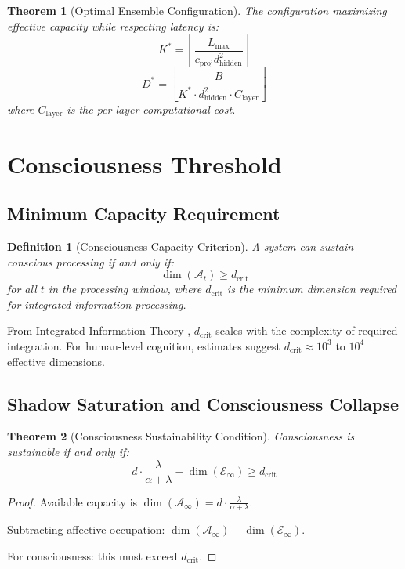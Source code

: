 \documentclass[reprint, amsmath, amssymb, aps, prd]{revtex4-2}
\newtheorem{definition}{Definition}[section]
\newtheorem{theorem}{Theorem}[section]
\begin{document}
\begin{theorem}[Optimal Ensemble Configuration]
The configuration maximizing effective capacity while respecting latency is:
\[
K^* = \left\lfloor \frac{L_{\text{max}}}{c_{\text{proj}} d_{\text{hidden}}^2} \right\rfloor
\]
\[
D^* = \left\lfloor \frac{B}{K^* \cdot d_{\text{hidden}}^2 \cdot C_{\text{layer}}} \right\rfloor
\]
where $C_{\text{layer}}$ is the per-layer computational cost.
\end{theorem}

\section{Consciousness Threshold}

\subsection{Minimum Capacity Requirement}

\begin{definition}[Consciousness Capacity Criterion]
A system can sustain conscious processing if and only if:
\[
\dim(\mathcal{A}_t) \geq d_{\text{crit}}
\]
for all $t$ in the processing window, where $d_{\text{crit}}$ is the minimum dimension required for integrated information processing.
\end{definition}

From Integrated Information Theory \cite{Tononi2016}, $d_{\text{crit}}$ scales with the complexity of required integration. For human-level cognition, estimates suggest $d_{\text{crit}} \approx 10^3$ to $10^4$ effective dimensions.

\subsection{Shadow Saturation and Consciousness Collapse}

\begin{theorem}[Consciousness Sustainability Condition]
Consciousness is sustainable if and only if:
\[
d \cdot \frac{\lambda}{\alpha + \lambda} - \dim(\mathcal{E}_\infty) \geq d_{\text{crit}}
\]
\end{theorem}

\begin{proof}
Available capacity is $\dim(\mathcal{A}_\infty) = d \cdot \frac{\lambda}{\alpha + \lambda}$.

Subtracting affective occupation: $\dim(\mathcal{A}_\infty) - \dim(\mathcal{E}_\infty)$.

For consciousness: this must exceed $d_{\text{crit}}$.
\end{proof}
\end{document}

